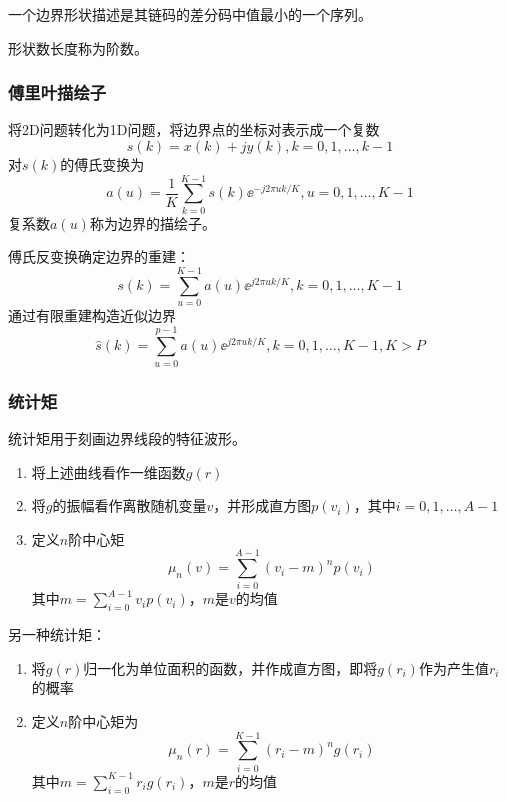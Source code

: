 一个边界形状描述是其链码的差分码中值最小的一个序列。

形状数长度称为阶数。

\subsubsection{傅里叶描绘子}
将2D问题转化为1D问题，将边界点的坐标对表示成一个复数
\[s(k)=x(k)+jy(k),k=0,1,\ldots,k-1\]
对$s(k)$的傅氏变换为
\[a(u)=\frac{1}{K}\sum_{k=0}^{K-1}s(k)\ee^{-j2\pi uk/K},u=0,1,\ldots,K-1\]
复系数$a(u)$称为边界的描绘子。

傅氏反变换确定边界的重建：
\[s(k)=\sum_{u=0}^{K-1}a(u)\ee^{j2\pi uk/K},k=0,1,\ldots,K-1\]
通过有限重建构造近似边界
\[\hat{s}(k)=\sum_{u=0}^{p-1}a(u)\ee^{j2\pi uk/K},k=0,1,\ldots,K-1,K>P\]

\subsubsection{统计矩}
统计矩用于刻画边界线段的特征波形。

\begin{enumerate}
	\item 将上述曲线看作一维函数$g(r)$
	\item 将$g$的振幅看作离散随机变量$v$，并形成直方图$p(v_i)$，其中$i=0,1,\ldots,A-1$
	\item 定义$n$阶中心矩
	\[\mu_n(v)=\sum_{i=0}^{A-1}(v_i-m)^np(v_i)\]
	其中$m=\sum_{i=0}^{A-1}v_ip(v_i)$，$m$是$v$的均值
\end{enumerate}

另一种统计矩：
\begin{enumerate}
	\item 将$g(r)$归一化为单位面积的函数，并作成直方图，即将$g(r_i)$作为产生值$r_i$的概率
	\item 定义$n$阶中心矩为
	\[\mu_n(r)=\sum_{i=0}^{K-1}(r_i-m)^ng(r_i)\]
	其中$m=\sum_{i=0}^{K-1}r_ig(r_i)$，$m$是$r$的均值
\end{enumerate}